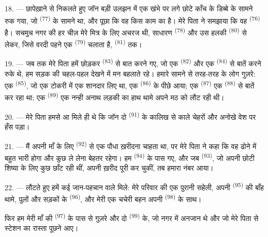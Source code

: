 \VUsaut{3.0mm}

18. --- छापेख़ाने से निकलते हुए जॉन बड़ी उलझन में एक खंभे पर लगे छोटे काँच के
डिब्बे के सामने रुक गया, जो  \textsuperscript{(77)} के सामने
था, और पूछा कि वह किस काम का है। मेरे पिता ने समझाया कि वह
 \textsuperscript{(76)} है। सचमुच नगर की हर चीज़ मेरे मित्र
के लिए अचरज थी, साधारण  \textsuperscript{(78)} और उस हलकी 
\textsuperscript{(80)} से लेकर, जिसे वरदी पहने एक 
\textsuperscript{(79)} चलाता है,  \textsuperscript{(81)} तक।

19. --- जब तक मेरे पिता हमें छोड़कर  \textsuperscript{(83)}
से बात करने गए, जो एक  \textsuperscript{(82)} और एक 
\textsuperscript{(84)} से बातें करने रुके थे, हम सड़क की चहल-पहल देखने में मन बहलाते
रहे। हमारे सामने से तरह-तरह के लोग गुज़रे: एक 
\textsuperscript{(85)}, जो एक टोकरी में एक शानदार  लिए था, एक
 \textsuperscript{(86)} के पीछे आया; एक
 \textsuperscript{(87)} एक 
\textsuperscript{(88)} से बातें कर रहा था; एक  \textsuperscript{(89)}
एक नन्ही अनाथ लड़की का हाथ थामे अपने मठ को लौट रही थी।

\VUsaut{3.0mm}

20. --- मेरे पिता हमसे आ मिले ही थे कि जॉन दो 
\textsuperscript{(91)} के कालिख से काले चेहरों और अनोखे वेश पर हँस पड़ा।

21. --- मैं अपनी माँ के लिए  \textsuperscript{(92)} से एक
पौधा ख़रीदना चाहता था, पर मेरे पिता ने कहा कि वह ढोने में बहुत भारी होगा और कुछ
 ले लेना बेहतर रहेगा। हम  \textsuperscript{(94)}
के पास गए, और जब  \textsuperscript{(93)}, जो अपनी छोटी शिष्या के
लिए कुछ छाँट रही थीं, अपनी ख़रीद पूरी कर चुकीं, तब हमारा नंबर आया।

22. --- लौटते हुए हमें कई जान-पहचान वाले मिले: मेरे परिवार की एक पुरानी सहेली,
अपनी  \textsuperscript{(95)} की बाँह थामे, पुलों और सड़कों के
 \textsuperscript{(96)}, और मेरी एक चचेरी बहन अपनी 
\textsuperscript{(98)} के साथ।

फिर हम मेरी माँ की  \textsuperscript{(97)} के पास से
गुज़रे और दो  \textsuperscript{(99)} के, जो नगर में अनजान थे और
जो मेरे पिता से स्टेशन का रास्ता पूछने आए।
\VUsaut{6.0mm}
\VUfilet{22mm}

